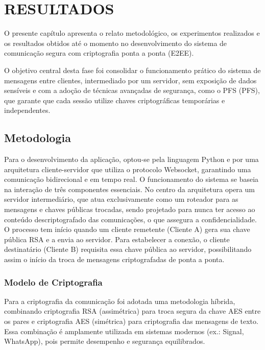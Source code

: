 \section{RESULTADOS}

O presente capítulo apresenta o relato metodológico, os experimentos
realizados e os resultados obtidos até o momento no desenvolvimento
do sistema de comunicação segura com criptografia ponta a ponta (\acs{E2EE}).

O objetivo central desta fase foi consolidar o funcionamento prático
do sistema de mensagens entre clientes, intermediado por um servidor,
sem exposição de dados sensíveis e com a adoção de técnicas avançadas
de segurança, como o \acs{PFS} (\acl{PFS}), que garante que
cada sessão utilize chaves criptográficas temporárias e independentes.

\subsection{Metodologia}

Para o desenvolvimento da aplicação, optou-se pela linguagem Python e
por uma arquitetura cliente-servidor que utiliza o protocolo
Websocket, garantindo uma comunicação bidirecional e em tempo real. O
funcionamento do sistema se baseia na interação de três componentes
essenciais. No centro da arquitetura opera um servidor intermediário,
que atua exclusivamente como um roteador para as mensagens e chaves
públicas trocadas, sendo projetado para nunca ter acesso ao conteúdo
descriptografado das comunicações, o que assegura a
confidencialidade. O processo tem início quando um cliente remetente
(Cliente A) gera sua chave pública \acs{RSA} e a envia ao servidor. Para
estabelecer a conexão, o cliente destinatário (Cliente B) requisita
essa chave pública ao servidor, possibilitando assim o início da
troca de mensagens criptografadas de ponta a ponta.

\subsubsection{Modelo de Criptografia}

Para a criptografia da comunicação foi adotada uma metodologia
híbrida, combinando criptografia \acs{RSA} (assimétrica) para troca segura
da chave \acs{AES} entre os pares e criptografia \acs{AES} (simétrica) para
criptografia das mensagens de texto. Essa combinação é amplamente
utilizada em sistemas modernos (ex.: Signal, WhatsApp), pois permite
desempenho e segurança equilibrados.

